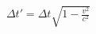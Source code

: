 \documentclass[preview]{standalone}
\begin{document}
\begin{align*}
\Delta t' = \Delta t \sqrt{1 - \frac{v^2}{c^2}}
\end{align*}
\end{document}
